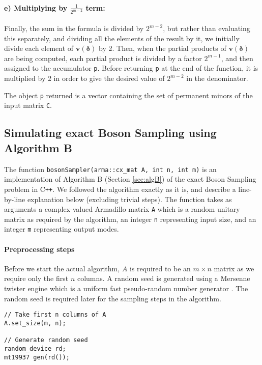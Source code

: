 \documentclass[11pt]{article}
\theoremstyle{theorem}
\theoremstyle{theorem}
\theoremstyle{remark}
\theoremstyle{note}
\theoremstyle{plain}
\theoremstyle{definition}
\begin{document}
\paragraph{e) Multiplying by $\frac{1}{2^{m-2}}$ term:} Finally, the sum in the formula is divided by $2^{m-2}$, but rather than evaluating this separately, and dividing all the elements of the result by it, we initially divide each element of $\mathbf{v}(\mathbf{\delta})$ by 2. Then, when the partial products of $\mathbf{v}(\mathbf{\delta})$ are being computed, each partial product is divided by a factor $2^{m-1}$, and then assigned to the accumulator \texttt{p}. Before returning  \texttt{p} at the end of the function, it is multiplied by 2 in order to give the desired value of $2^{m-2}$ in the denominator.

The object \texttt{p} returned is a vector containing the set of permanent minors of the input matrix \texttt{C}.

\subsection{Simulating exact Boson Sampling using Algorithm B}
The function \texttt{bosonSampler(arma::cx_mat A, int n, int m)} is an implementation of Algorithm B (Section \ref{sec:algB}) of the exact Boson Sampling problem in C\texttt{++}. We followed the algorithm exactly as it is, and describe a line-by-line explanation below (excluding trivial steps). The function takes as arguments a complex-valued Armadillo matrix \texttt{A} which is a random unitary matrix as required by the algorithm, an integer \texttt{n} representing input size, and an integer \texttt{m} representing output modes.
\paragraph{Preprocessing steps} Before we start the actual algorithm, $A$ is required to be an $m \times n$ matrix as we require only the first $n$ columns. A random seed is generated using a Mersenne twister engine which is a uniform fast pseudo-random number generator \cite{matsumoto1998}. The random seed is required later for the sampling steps in the algorithm.
\begin{verbatim}
// Take first n columns of A
A.set_size(m, n);

// Generate random seed
random_device rd;
mt19937 gen(rd());
\end{verbatim}
\end{document}
